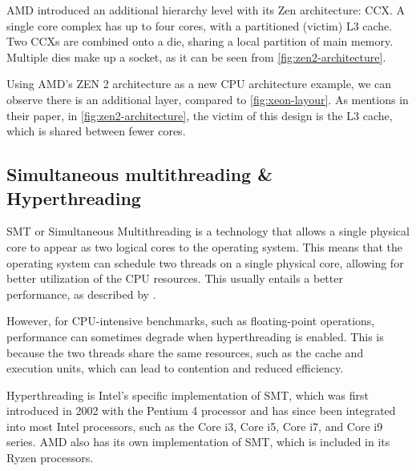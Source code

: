 AMD introduced an additional hierarchy level with its Zen architecture: \gls{CCX}. A single core complex has up to four cores, with a partitioned (victim) L3 cache. Two \glspl{CCX} are combined onto a die, sharing a local partition of main memory. Multiple dies make up a socket, as it can be seen from \autoref{fig:zen2-architecture}.

Using AMD's ZEN 2 architecture as a new CPU architecture example, we can observe there is an additional layer, compared to \autoref{fig:xeon-layour}. As \textcite{zen2-architecture} mentions in their paper, in \autoref{fig:zen2-architecture}, the victim of this design is the L3 cache, which is shared between fewer cores.


\subsection{Simultaneous multithreading \& Hyperthreading}
\label{sec:hyperthreading}

SMT or Simultaneous Multithreading is a technology that allows a single physical core to appear as two logical cores to the operating system. This means that the operating system can schedule two threads on a single physical core, allowing for better utilization of the CPU resources. This usually entails a better performance, as described by \textcite{hyperthreading}.

However, for CPU-intensive benchmarks, such as floating-point operations, performance can sometimes degrade when hyperthreading is enabled. This is because the two threads share the same resources, such as the cache and execution units, which can lead to contention and reduced efficiency.

Hyperthreading is Intel's specific implementation of SMT, which was first introduced in 2002 with the Pentium 4 processor and has since been integrated into most Intel processors, such as the Core i3, Core i5, Core i7, and Core i9 series. AMD also has its own implementation of SMT, which is included in its Ryzen processors.


